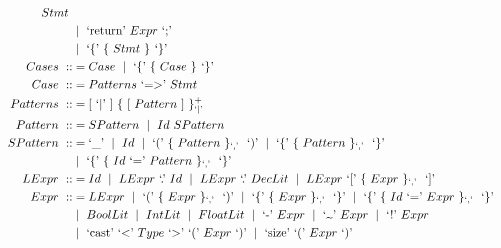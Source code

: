 \documentclass[letterpaper]{article}
\newcommand{\nonterminal}[1]{#1\ }
\newcommand{\terminal}[1]{\text{`#1'}\ }
\newcommand{\gramOption}[1]{[\ #1]\ }
\newcommand*{\gramRepeat}[2][]{\{\ #2\}_{#1}\ }
\newcommand*{\gramSome}[2][]{\{\ #2\}^{+}_{#1}\ }
\newcommand{\gramOr}{\mid\ }
\begin{document}
\begin{align*}
      \nonterminal{Stmt} \\
    &\gramOr \terminal{return} \nonterminal{Expr} \terminal{;} \\
    &\gramOr \terminal{\{} \gramRepeat{\nonterminal{Stmt}} \terminal{\}} \\
%
  \nonterminal{Cases} ::&= \nonterminal{Case}
    \gramOr \terminal{\{} \gramRepeat{\nonterminal{Case}} \terminal{\}} \\
%
  \nonterminal{Case} ::&=
    \nonterminal{Patterns} \terminal{=\textgreater} \nonterminal{Stmt} \\
%
  \nonterminal{Patterns} ::&=
    \gramOption{\terminal{\textbar}}
      \gramSome[\terminal{\textbar}]{\gramOption{\nonterminal{Pattern}}} \\
%
  \nonterminal{Pattern} ::&= \nonterminal{SPattern}
    \gramOr \nonterminal{Id} \nonterminal{SPattern} \\
%
  \nonterminal{SPattern} ::&= \terminal{\textunderscore}
    \gramOr \nonterminal{Id}
    \gramOr \terminal{(} \gramRepeat[\terminal{,}]{\nonterminal{Pattern}} \terminal{)}
    \gramOr \terminal{\{} \gramRepeat[\terminal{,}]{\nonterminal{Pattern}} \terminal{\}} \\
    &\gramOr \terminal{\{}
      \gramRepeat[\terminal{,}]{\nonterminal{Id} \terminal{=} \nonterminal{Pattern}} \terminal{\}} \\
%
  \nonterminal{LExpr} ::&= \nonterminal{Id}
    \gramOr \nonterminal{LExpr} \terminal{.} \nonterminal{Id}
    \gramOr \nonterminal{LExpr} \terminal{.} \nonterminal{DecLit}
    \gramOr \nonterminal{LExpr} \terminal{[} \gramRepeat[\terminal{,}]{\nonterminal{Expr}} \terminal{]} \\
%
  \nonterminal{Expr} ::&= \nonterminal{LExpr}
    \gramOr \terminal{(} \gramRepeat[\terminal{,}]{\nonterminal{Expr}} \terminal{)}
    \gramOr \terminal{\{} \gramRepeat[\terminal{,}]{\nonterminal{Expr}} \terminal{\}}
    \gramOr \terminal{\{}
      \gramRepeat[\terminal{,}]{\nonterminal{Id} \terminal{=} \nonterminal{Expr}} \terminal{\}} \\
    &\gramOr \nonterminal{BoolLit} \gramOr \nonterminal{IntLit} \gramOr \nonterminal{FloatLit}
     \gramOr \terminal{-} \nonterminal{Expr}
     \gramOr \terminal{\texttildelow} \nonterminal{Expr}
     \gramOr \terminal{!} \nonterminal{Expr} \\
    &\gramOr \terminal{cast} \terminal{\textless} \nonterminal{Type} \terminal{\textgreater}
            \terminal{(} \nonterminal{Expr} \terminal{)}
     \gramOr \terminal{size} \terminal{(} \nonterminal{Expr} \terminal{)} \\

\end{align*}
\end{document}
